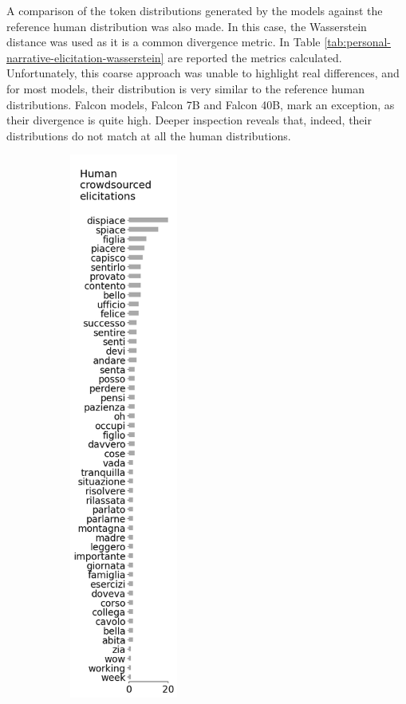 
A comparison of the token distributions generated by the models against the reference human distribution was also made. In this case, the Wasserstein distance \cite{wasserstein} was used as it is a common divergence metric. In Table \ref{tab:personal-narrative-elicitation-wasserstein} are reported the metrics calculated. Unfortunately, this coarse approach was unable to highlight real differences, and for most models, their distribution is very similar to the reference human distributions. Falcon models, Falcon 7B and Falcon 40B, mark an exception, as their divergence is quite high. Deeper inspection reveals that, indeed, their distributions do not match at all the human distributions. 
\begin{figure}[!htbp]
    \centering
    \begin{subfigure}[t]{0.25\textwidth}
        \centering
        \includegraphics[height=18cm]{assets/imgs/dataset-test-set-top-50-answers-vertical.png}

\end{subfigure}
\end{figure}
